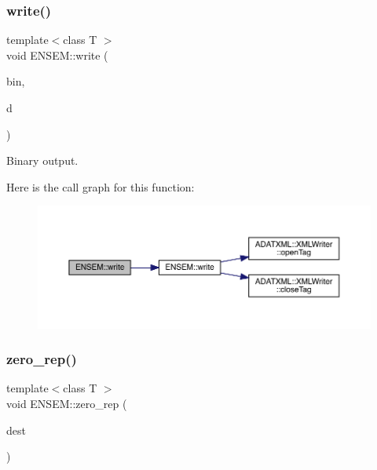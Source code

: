 \mbox{\label{group__rcomplex_ga5087feb4530a8e07f00227de0852c625}} 
\subsubsection{\texorpdfstring{write()}{write()}}
{\footnotesize\ttfamily template$<$class T $>$ \\
void E\+N\+S\+E\+M\+::write (\begin{DoxyParamCaption}\item[{\mbox{\hyperlink{classADATIO_1_1BinaryWriter}{A\+D\+A\+T\+I\+O\+::\+Binary\+Writer}} \&}]{bin,  }\item[{const \mbox{\hyperlink{classENSEM_1_1RComplex}{R\+Complex}}$<$ T $>$ \&}]{d }\end{DoxyParamCaption})\hspace{0.3cm}{\ttfamily [inline]}}



Binary output. 

Here is the call graph for this function\+:\nopagebreak
\begin{figure}[H]
\begin{center}
\leavevmode
\includegraphics[width=350pt]{da/dc7/group__rcomplex_ga5087feb4530a8e07f00227de0852c625_cgraph}
\end{center}
\end{figure}
\mbox{\label{group__rcomplex_gaf64745e6e9f179738a187230acf6b2ea}} 
\subsubsection{\texorpdfstring{zero\_rep()}{zero\_rep()}}
{\footnotesize\ttfamily template$<$class T $>$ \\
void E\+N\+S\+E\+M\+::zero\+\_\+rep (\begin{DoxyParamCaption}\item[{\mbox{\hyperlink{classENSEM_1_1RComplex}{R\+Complex}}$<$ T $>$ \&}]{dest }\end{DoxyParamCaption})\hspace{0.3cm}{\ttfamily [inline]}}




